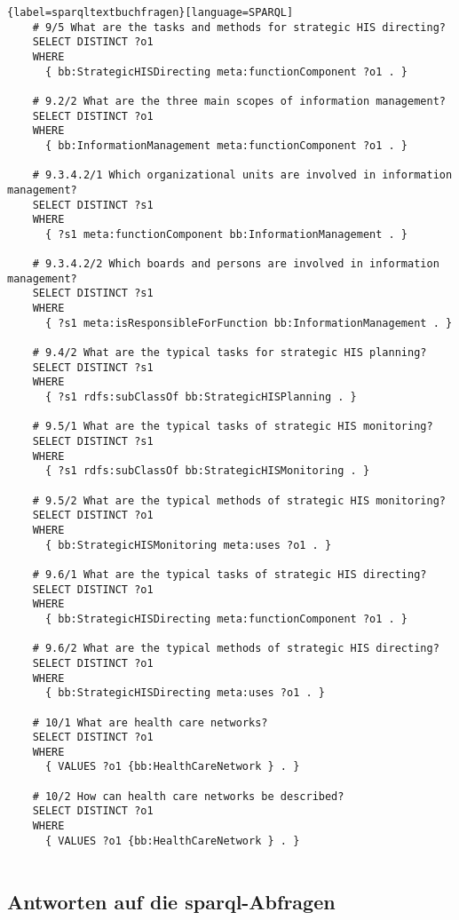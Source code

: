\begin{lstlisting}{label=sparqltextbuchfragen}[language=SPARQL]
    # 9/5 What are the tasks and methods for strategic HIS directing?
    SELECT DISTINCT ?o1
    WHERE
      { bb:StrategicHISDirecting meta:functionComponent ?o1 . }
    
    # 9.2/2 What are the three main scopes of information management?
    SELECT DISTINCT ?o1
    WHERE
      { bb:InformationManagement meta:functionComponent ?o1 . }
    
    # 9.3.4.2/1 Which organizational units are involved in information management?
    SELECT DISTINCT ?s1
    WHERE
      { ?s1 meta:functionComponent bb:InformationManagement . }
    
    # 9.3.4.2/2 Which boards and persons are involved in information management?
    SELECT DISTINCT ?s1
    WHERE
      { ?s1 meta:isResponsibleForFunction bb:InformationManagement . }
    
    # 9.4/2 What are the typical tasks for strategic HIS planning?
    SELECT DISTINCT ?s1
    WHERE
      { ?s1 rdfs:subClassOf bb:StrategicHISPlanning . }
    
    # 9.5/1 What are the typical tasks of strategic HIS monitoring?
    SELECT DISTINCT ?s1
    WHERE
      { ?s1 rdfs:subClassOf bb:StrategicHISMonitoring . }
    
    # 9.5/2 What are the typical methods of strategic HIS monitoring?
    SELECT DISTINCT ?o1
    WHERE
      { bb:StrategicHISMonitoring meta:uses ?o1 . }
    
    # 9.6/1 What are the typical tasks of strategic HIS directing?
    SELECT DISTINCT ?o1
    WHERE
      { bb:StrategicHISDirecting meta:functionComponent ?o1 . }
    
    # 9.6/2 What are the typical methods of strategic HIS directing?
    SELECT DISTINCT ?o1
    WHERE
      { bb:StrategicHISDirecting meta:uses ?o1 . }
    
    # 10/1 What are health care networks?
    SELECT DISTINCT ?o1
    WHERE
      { VALUES ?o1 {bb:HealthCareNetwork } . }
    
    # 10/2 How can health care networks be described?
    SELECT DISTINCT ?o1
    WHERE
      { VALUES ?o1 {bb:HealthCareNetwork } . }
    
    \end{lstlisting}

\subsection[Antworten auf die SPARQL-Abfragen]{Antworten auf die \ac{sparql}-Abfragen}\label{sub:antwortentextbuch}

